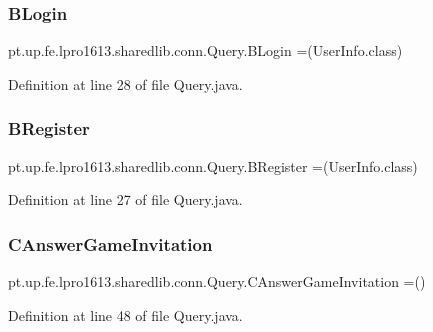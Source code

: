 \subsubsection{\texorpdfstring{B\+Login}{BLogin}}
{\footnotesize\ttfamily pt.\+up.\+fe.\+lpro1613.\+sharedlib.\+conn.\+Query.\+B\+Login =(User\+Info.\+class)}



Definition at line 28 of file Query.\+java.

\hypertarget{enumpt_1_1up_1_1fe_1_1lpro1613_1_1sharedlib_1_1conn_1_1_query_aa20884de85d3b004e5926324f91f95f5}{}\label{enumpt_1_1up_1_1fe_1_1lpro1613_1_1sharedlib_1_1conn_1_1_query_aa20884de85d3b004e5926324f91f95f5} 
\subsubsection{\texorpdfstring{B\+Register}{BRegister}}
{\footnotesize\ttfamily pt.\+up.\+fe.\+lpro1613.\+sharedlib.\+conn.\+Query.\+B\+Register =(User\+Info.\+class)}



Definition at line 27 of file Query.\+java.

\hypertarget{enumpt_1_1up_1_1fe_1_1lpro1613_1_1sharedlib_1_1conn_1_1_query_a05335746d2327f5ad8b977eb6d491635}{}\label{enumpt_1_1up_1_1fe_1_1lpro1613_1_1sharedlib_1_1conn_1_1_query_a05335746d2327f5ad8b977eb6d491635} 
\subsubsection{\texorpdfstring{C\+Answer\+Game\+Invitation}{CAnswerGameInvitation}}
{\footnotesize\ttfamily pt.\+up.\+fe.\+lpro1613.\+sharedlib.\+conn.\+Query.\+C\+Answer\+Game\+Invitation =()}



Definition at line 48 of file Query.\+java.

